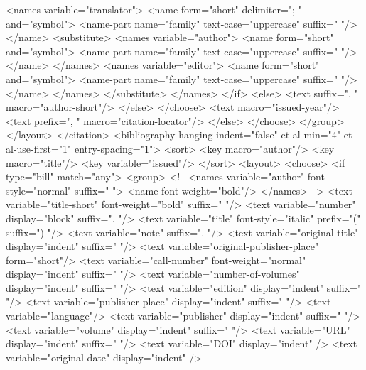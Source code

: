                 <names variable="translator">
                  <name form="short" delimiter="; " and="symbol">
                    <name-part name="family" text-case="uppercase" suffix=" "/>
                  </name>
                  <substitute>
                    <names variable="author">
                      <name form="short" and="symbol">
                        <name-part name="family" text-case="uppercase" suffix=" "/>
                      </name>
                    </names>
                    <names variable="editor">
                      <name form="short" and="symbol">
                        <name-part name="family" text-case="uppercase" suffix=" "/>
                      </name>
                    </names>
                  </substitute>
                </names>
              </if>
              <else>
                <text suffix=", " macro="author-short"/>
              </else>
            </choose>
            <text macro="issued-year"/>
            <text prefix=", " macro="citation-locator"/>
          </else>
        </choose>
      </group>
    </layout>
  </citation>
  <bibliography hanging-indent="false" et-al-min="4" et-al-use-first="1" entry-spacing="1">
    <sort>
      <key macro="author"/>
      <key macro="title"/>
      <key variable="issued"/>
    </sort>
    <layout>
      <choose>
        <if type="bill" match="any">
          <group>
<!--
            <names variable="author" font-style="normal" suffix=" ">
              <name font-weight="bold"/>
            </names>
 -->
             <text variable="title-short" font-weight="bold" suffix=" "/>
            <text variable="number" display="block" suffix=". "/>
            <text variable="title" font-style="italic" prefix="(" suffix=") "/>
            <text variable="note" suffix=". "/>
            <text variable="original-title" display="indent" suffix=" "/>
            <text variable="original-publisher-place" form="short"/>
            <text variable="call-number" font-weight="normal" display="indent" suffix=" "/>
            <text variable="number-of-volumes" display="indent" suffix=" "/>
            <text variable="edition" display="indent" suffix=" "/>
            <text variable="publisher-place" display="indent" suffix=" "/>
            <text variable="language"/>
            <text variable="publisher" display="indent" suffix=" "/>
            <text variable="volume" display="indent" suffix=" "/>
            <text variable="URL" display="indent" suffix=" "/>
            <text variable="DOI" display="indent" />
            <text variable="original-date" display="indent" />
